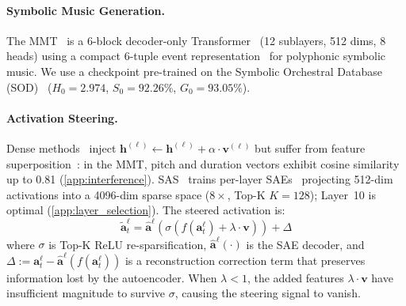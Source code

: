 \documentclass{article}
\theoremstyle{plain}
\begin{document}
\paragraph{Symbolic Music Generation.}
The MMT~\cite{dong2023multitrack} is a 6-block decoder-only Transformer~\cite{vaswani2017attention} (12 sublayers, 512 dims, 8 heads) using a compact 6-tuple event representation~\cite{fradet2023miditok} for polyphonic symbolic music. We use a checkpoint pre-trained on the Symbolic Orchestral Database (SOD)~\cite{crestel2018sod} ($H_0{=}2.974$, $S_0{=}92.26\%$, $G_0{=}93.05\%$).

\paragraph{Activation Steering.}
Dense methods~\cite{turner2024activation, rimsky2024steering, arditi2024refusal, rodriguez2025meantransport} inject $\mathbf{h}^{(\ell)} \leftarrow \mathbf{h}^{(\ell)} + \alpha \cdot \mathbf{v}^{(\ell)}$ but suffer from feature superposition~\cite{elhage2022superposition}: in the MMT, pitch and duration vectors exhibit cosine similarity up to 0.81 (\cref{app:interference}). SAS~\cite{bayat2025sas} trains per-layer SAEs~\cite{bricken2023monosemanticity, cunningham2024sparse} projecting 512-dim activations into a 4096-dim sparse space ($8{\times}$, Top-K $K{=}128$); Layer~10 is optimal (\cref{app:layer_selection}). The steered activation is:
\begin{equation}
    \tilde{\mathbf{a}}_t^\ell = \hat{\mathbf{a}}^\ell\!\left(\sigma\!\left(f(\mathbf{a}_t^\ell) + \lambda \cdot \mathbf{v}\right)\right) + \Delta
    \label{eq:sas}
\end{equation}
where $\sigma$ is Top-K ReLU re-sparsification, $\hat{\mathbf{a}}^\ell(\cdot)$ is the SAE decoder, and $\Delta := \mathbf{a}_t^\ell - \hat{\mathbf{a}}^\ell(f(\mathbf{a}_t^\ell))$ is a reconstruction correction term that preserves information lost by the autoencoder. When $\lambda < 1$, the added features $\lambda \cdot \mathbf{v}$ have insufficient magnitude to survive $\sigma$, causing the steering signal to vanish.
\end{document}
